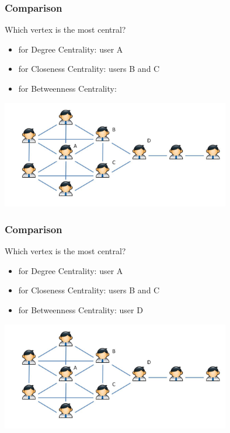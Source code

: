 \begin{frame}
  \frametitle{Comparison}
  \begin{block}{Which vertex is the most central?}
    \begin{itemize}
      \item for Degree Centrality: {\color{blue}  user A}
      \item for Closeness Centrality: {\color{blue}  users B and C}
      \item for Betweenness Centrality:
    \end{itemize}
  \end{block}
  \centering
  \includegraphics[width=100mm]{imgs/centrality_comparison.pdf}
\end{frame}

\begin{frame}
  \frametitle{Comparison}
  \begin{block}{Which vertex is the most central?}
    \begin{itemize}
      \item for Degree Centrality: {\color{blue}  user A}
      \item for Closeness Centrality: {\color{blue}  users B and C}
      \item for Betweenness Centrality: {\color{blue}  user D}
    \end{itemize}
  \end{block}
  \centering
  \includegraphics[width=100mm]{imgs/centrality_comparison.pdf}
\end{frame}


